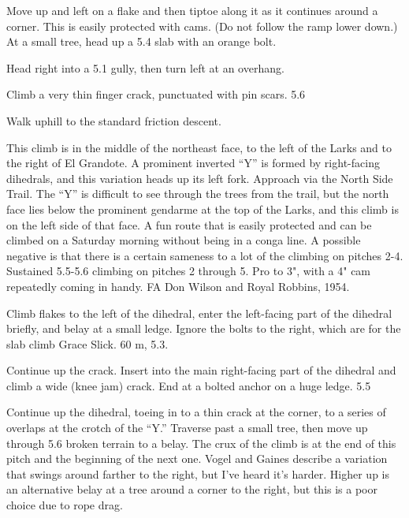 \documentclass{tahquitz}
\begin{document}
 Move up and left on a flake
and then tiptoe along it as it continues around a corner.
This is easily protected with cams. (Do not follow the ramp lower down.) At a small
tree, head up a 5.4 slab with an orange bolt.

 Head right into a 5.1 gully, then turn left at an overhang.

 Climb a very thin finger crack, punctuated with pin scars. 5.6

Walk uphill to the standard friction descent.




This climb is in the middle of the northeast face, to the left of the
Larks and to the right of El Grandote. A prominent inverted ``Y'' is
formed by right-facing dihedrals, and this variation heads up its
left fork. Approach via the North Side Trail. The ``Y'' is difficult to
see through the trees from the trail, but the north face lies below
the prominent gendarme at the top of the Larks, and this climb is on
the left side of that face. A fun route that is easily protected and
can be climbed on a Saturday morning without being in a conga line. A
possible negative is that there is a certain sameness to a lot of the
climbing on pitches 2-4. Sustained 5.5-5.6 climbing on pitches 2
through 5. Pro to 3", with  a 4" cam repeatedly coming in handy.
FA Don Wilson and Royal Robbins, 1954.

 Climb flakes to the left of the dihedral, enter the left-facing
part of the dihedral briefly, and belay at a small ledge. Ignore the
bolts to the right, which are for the slab climb Grace Slick. 60 m,
5.3.

 Continue up the crack. Insert into the main right-facing part of
the dihedral and climb a wide (knee jam) crack. End at a bolted
anchor on a huge ledge. 5.5

 Continue up the dihedral, toeing in to a thin crack at the
corner, to a series of overlaps at the crotch of the ``Y.'' Traverse
past a small tree, then move up through 5.6 broken terrain to a
belay. The crux of the climb is at the end of this pitch and the
beginning of the next one. Vogel and Gaines describe a variation that
swings around farther to the right, but I've heard it's harder.
Higher up is an alternative belay at a tree around a corner to the
right, but this is a poor choice due to rope drag.
\end{document}
